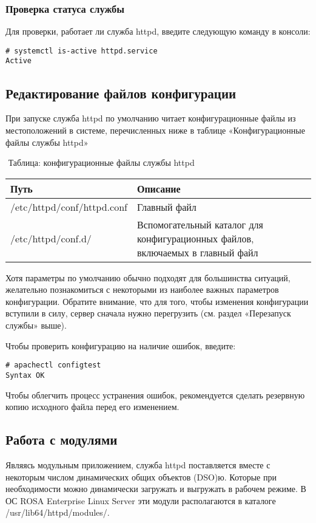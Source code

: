 \documentclass[a4paper,10pt,twoside]{article}
\begin{document}
\subsubsection{Проверка статуса службы}
Для проверки, работает ли служба httpd, введите следующую команду в консоли:
\begin{verbatim}
# systemctl is-active httpd.service
Active
\end{verbatim} 


\subsection{Редактирование файлов конфигурации}
При запуске служба httpd по умолчанию читает конфигурационные файлы из местоположений в системе, перечисленных ниже в таблице «Конфигурационные файлы службы httpd»

⁠
Таблица: конфигурационные файлы службы httpd

\begin{longtable}{ | m{5cm} | m{10cm} | }\hline  
\textbf{Путь} & \textbf{Описание}\\\hline
 /etc/httpd/conf/httpd.conf & Главный файл\\\hline
 /etc/httpd/conf.d/ & Вспомогательный каталог для конфигурационных файлов, включаемых в главный файл\\\hline
\end{longtable}


Хотя параметры по умолчанию обычно подходят для большинства ситуаций, желательно познакомиться с некоторыми из наиболее важных параметров конфигурации. Обратите внимание, что для того, чтобы изменения конфигурации вступили в силу, сервер сначала нужно перегрузить (см. раздел «Перезапуск службы» выше).

Чтобы проверить конфигурацию на наличие ошибок, введите:
\begin{verbatim}
# apachectl configtest
Syntax OK
\end{verbatim} 

Чтобы облегчить процесс устранения ошибок, рекомендуется сделать резервную копию исходного файла перед его изменением.


\subsection{Работа с модулями}
Являясь модульным приложением, служба httpd поставляется вместе с некоторым числом динамических общих объектов (DSO)ю. Которые при необходимости можно динамически загружать и выгружать в рабочем режиме. В ОС ROSA Enterprise Linux Server эти модули располагаются в каталоге /usr/lib64/httpd/modules/.
\end{document}
